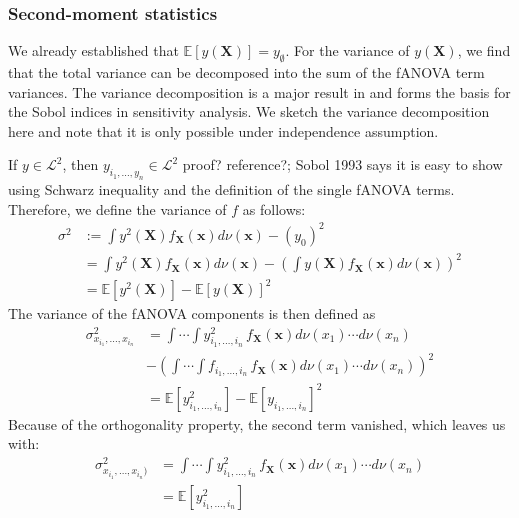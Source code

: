 \subsubsection*{Second-moment statistics}
We already established that $\mathbb{E}[y(\boldsymbol{X})] = y_{\emptyset}$.
For the variance of $y(\boldsymbol{X})$, we find that the total variance can be decomposed into the sum of the fANOVA term variances. The variance decomposition is a major result in \cite{sobol1993sensitivity} and forms the basis for the Sobol indices in sensitivity analysis. We sketch the variance decomposition here and note that it is only possible under independence assumption.\par
If $y \in \mathcal{L}^2$, then $y_{i_{1}, \dots, y_{n}} \in \mathcal{L}^2$ {\color{blue}proof? reference?; Sobol 1993 says it is easy to show using Schwarz inequality and the definition of the single fANOVA terms.}
Therefore, we define the variance of $f$ as follows:
\begin{align*}
    \sigma^2 &:= \int y^2(\boldsymbol{X}) f_{\boldsymbol{X}}(\boldsymbol{x}) d\nu (\boldsymbol{x}) - (y_0)^2 \\
    &= \int y^2(\boldsymbol{X}) f_{\boldsymbol{X}}(\boldsymbol{x}) d\nu (\boldsymbol{x}) - (\int y(\boldsymbol{X}) f_{\boldsymbol{X}}(\boldsymbol{x}) d\nu (\boldsymbol{x}))^2 \\
    &= \mathbb{E}[y^2(\boldsymbol{X})] - \mathbb{E}[y(\boldsymbol{X})]^2
    \label{variance_whole}
\end{align*}
The variance of the fANOVA components is then defined as
\begin{align*}
    \sigma^2_{x_{i_1}, \dots, x_{i_n}}
    &= \int \cdots \int y^2_{i_{1}, \dots, i_{n}} \, f_{\boldsymbol{X}}(\boldsymbol{x}) d\nu(x_1) \cdots d\nu(x_n) \\
    & - \left( \int \cdots \int f_{i_{1}, \dots, i_{n}} \, f_{\boldsymbol{X}}(\boldsymbol{x}) d\nu(x_1) \cdots d\nu(x_n) \right)^2\\
    &= \mathbb{E}[y^2_{i_{1}, \dots, i_{n}}] - \mathbb{E}[y_{i_{1}, \dots, i_{n}}]^2
\end{align*}
Because of the orthogonality property, the second term vanished, which leaves us with:
\begin{align*}
    \sigma^2_{x_{i_1}, \dots, x_{i_n})}
    &= \int \cdots \int y^2_{i_{1}, \dots, i_{n}} \, f_{\boldsymbol{X}}(\boldsymbol{x}) d\nu(x_1) \cdots d\nu(x_n)\\
    &= \mathbb{E}[y^2_{i_{1}, \dots, i_{n}}]
\end{align*}


